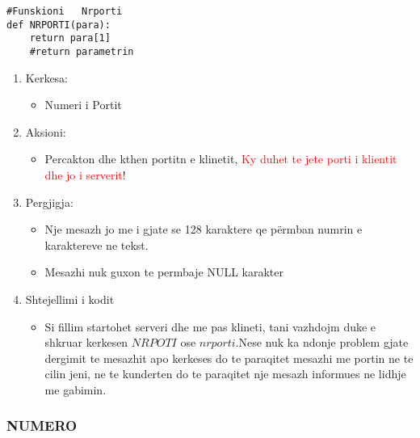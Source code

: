 \documentclass[]{article}
\begin{document}
\begin{lstlisting}
#Funskioni   Nrporti
def NRPORTI(para):
    return para[1]
    #return parametrin
\end{lstlisting}
\begin{enumerate}
\item Kerkesa:
\begin{itemize}
\item Numeri i Portit
\end{itemize}
\item Aksioni:
\begin{itemize}
\item Percakton dhe kthen portitn e klinetit, \textcolor{red}{Ky duhet te jete porti i klientit dhe jo i serverit}!
\end{itemize} 
\item Pergjigja:
\begin{itemize}
\item Nje mesazh jo me i gjate se 128 karaktere qe përmban numrin e karaktereve ne tekst.
\item  Mesazhi nuk guxon te permbaje NULL karakter

\end{itemize}
\item Shtejellimi i kodit
\begin{itemize}
\item Si fillim startohet serveri dhe me pas klineti, tani vazhdojm duke e shkruar kerkesen $NRPOTI$ ose $nrporti$.Nese nuk ka ndonje problem gjate dergimit te mesazhit apo kerkeses do te paraqitet mesazhi me portin ne te cilin jeni, ne te kunderten do te paraqitet nje mesazh informues ne lidhje me gabimin.
\end{itemize}
\end{enumerate}
\newpage
\subsubsection{NUMERO}
\end{document}
